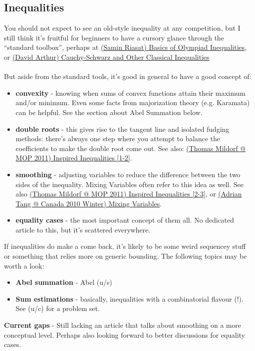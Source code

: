 	\subsection{Inequalities}
	You should not expect to see an old-style inequality at any competition, but I still think it's fruitful for beginners to have a cursory glance through the ``standard toolbox'', perhaps at  \href{run:./F_Algebra/(Samin Riasat) Basics of Olympiad Inequalities.pdf}{(Samin Riasat) Basics of Olympiad Inequalities}, or \href{run:./F_Algebra/(David Arthur) Cauchy-Schwarz and Other Classical Inequalities.pdf}{(David Arthur) Cauchy-Schwarz and Other Classical Inequalities}\\\\
	But aside from the standard tools, it's good in general to have a good concept of:
	\begin{itemize}
	\item \textbf{convexity} - knowing when sums of convex functions attain their maximum and/or minimum. Even some facts from majorization theory (e.g. Karamata) can be helpful. See the section about Abel Summation below.
	\item \textbf{double roots} - this gives rise to the tangent line and isolated fudging methods: there's always one step where you attempt to balance the coefficients to make the double root come out. See also: \href{run:./F_Algebra/(Thomas Mildorf @ MOP 2011) Inspired Inequalities.pdf}{(Thomas Mildorf @ MOP 2011) Inspired Inequalities [1-2]}.
	\item \textbf{smoothing} - adjusting variables to reduce the difference between the two sides of the inequality. Mixing Variables often refer to this idea as well. See also \href{run:./F_Algebra/(Thomas Mildorf @ MOP 2011) Inspired Inequalities.pdf}{(Thomas Mildorf @ MOP 2011) Inspired Inequalities [2-3]}, or \href{run:./F_Algebra/(Adrian Tang @ Canada 2010 Winter) Mixing Variables.pdf}{(Adrian Tang @ Canada 2010 Winter) Mixing Variables}.
	\item \textbf{equality cases} - the most important concept of them all. No dedicated article to this, but it's scattered everywhere.
	\end{itemize}
	If inequalities do make a come back, it's likely to be some weird sequencey stuff or something that relies more on generic bounding. The following topics may be worth a look:
	\begin{itemize}
	\item \textbf{Abel summation} - Abel (u/s)
	\item \textbf{Sum estimations} - basically, inequalities with a combinatorial flavour (!). See (u/c) for a problem set.
	\end{itemize}
	\textbf{Current gaps} - Still lacking an article that talks about smoothing on a more conceptual level. Perhaps also looking forward to better discussions for equality cases.
